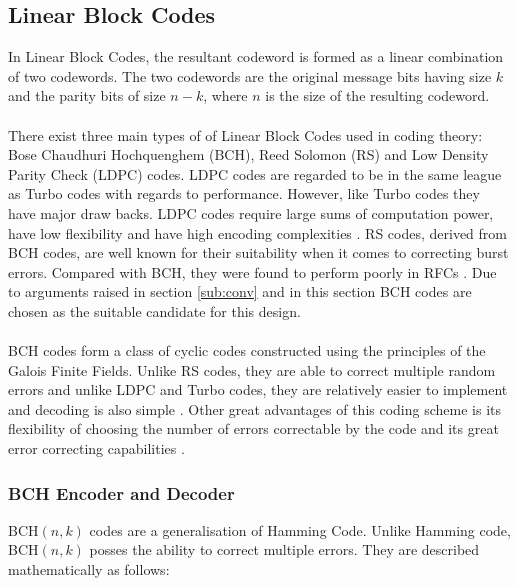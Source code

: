 \documentclass[11pt]{report}
\begin{document}
\subsection{Linear Block Codes}
In Linear Block Codes, the resultant codeword is formed as a linear combination of two codewords. The two codewords are the original message bits having size $k$ and the parity bits of size $n-k$, where $n$ is the size of the resulting codeword.
\\
\\
There exist three main types of of Linear Block Codes used in coding theory: Bose Chaudhuri Hochquenghem (BCH), Reed Solomon (RS) and Low Density Parity Check (LDPC) codes. LDPC codes are regarded to be in the same league as Turbo codes with regards to performance. However, like Turbo codes they have major draw backs. LDPC codes require large sums of computation power, have low flexibility and have high encoding complexities \cite{59,56}.  RS codes, derived from BCH codes, are well known for their suitability when it comes to correcting burst errors. Compared with BCH, they were found to perform poorly in RFCs \cite{10,57}. Due to arguments raised in section \ref{sub:conv} and in this section BCH codes are chosen as the suitable candidate for this design.
\\
\\
BCH codes form a class of cyclic codes constructed using the principles of the Galois Finite Fields. Unlike RS codes, they are able to correct multiple random errors and unlike LDPC and Turbo codes, they are relatively easier to implement and decoding is also simple \cite{20,57}. Other great advantages of this coding scheme is its flexibility of choosing the number of errors correctable by the code and its great error correcting capabilities \cite{57,58,22}.

\subsubsection{BCH Encoder and Decoder}
BCH$(n,k)$ codes are a generalisation of Hamming Code. Unlike Hamming code, BCH$(n,k)$ posses the ability to correct multiple errors. They are described mathematically as follows:
\end{document}
